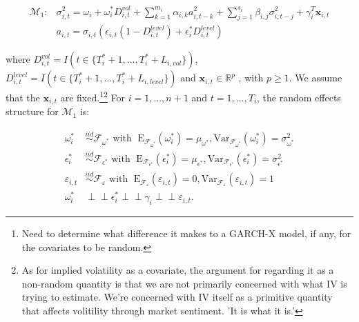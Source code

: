 \documentclass[11pt]{article}
\newcommand{\R}{\mathbb{R}}
\newcommand{\x}{\textbf{x}}
\def\mbf#1{\mathbf{#1}} %
\newcommand{\simiid}{\stackrel{iid}{\sim}} %
\newcommand{\indep}{\perp \!\!\! \perp } %
\def\mrm#1{\mathrm{#1}} %
\def\mc#1{\mathcal{#1}} %
\def\mc#1{\mathcal{#1}}
\theoremstyle{definition}
\begin{document}
\begin{align}
\mc{M}_1 \colon &\sigma^{2}_{i,t} = \omega_{i} + \omega^{*}_i D^{vol}_{i,t} + \sum^{m_{i}}_{k=1}\alpha_{i,k}a^{2}_{i,t-k} + \sum_{j=1}^{s_{i}}\beta_{i,j}\sigma_{i,t-j}^{2} + \gamma_{i}^{T} \x_{i,t}\\
&a_{i,t} = \sigma_{i,t}(\epsilon_{i,t}(1-D^{level}_{i,t}) + \epsilon^{*}_{i}D^{level}_{i,t}) \label{equation1}
\end{align}

 where $D^{vol}_{i,t} = I(t \in \{T_i^* + 1,...,T_i^* + L_{i, vol}\})$, $D^{level}_{i,t} = I(t \in \{T_i^* + 1,...,T_i^* + L_{i, level}\})$ 
and $\x_{i,t} \in \R^{p}$ , with $p \geq 1$.  We assume that the 
$\mbf{x}_{i,t}$ are fixed.\footnote{Need to determine what difference it makes to a GARCH-X model, if any, for the covariates to be random.}\footnote{As for implied volatility as a covariate, the argument for regarding it as a non-random quantity is that we are not primarily concerned with what IV is trying to estimate.  We're concerned with IV itself as a primitive quantity that affects volitility through market sentiment. 'It is what it is.'}  For $i = 1, \ldots, n+1$ and $t=1, \ldots, T_i$, the random effects structure for $\mc{M}_1$ is:

\begin{align*}
\omega^{*}_i &\simiid \mc{F}_{\omega^{*}} \text{ with }  \; \mrm{E}_{\mc{F}_{\omega^{*}}}(\omega^{*}_i) = \mu_{\omega^{*}}, \mrm{Var}_{\mc{F}_{\omega^{*}}}(\omega^{*}_i)  = \sigma^2_{\omega^{*}}  \\
\epsilon^{*}_i &\simiid \mc{F}_{\epsilon^{*}} \text{ with }  \; \mrm{E}_{\mc{F}_{\epsilon^{*}}}(\epsilon^{*}_i) = \mu_{\epsilon^{*}}, \mrm{Var}_{\mc{F}_{\epsilon^{*}}}(\epsilon^{*}_i)  = \sigma^2_{\epsilon^{*}}  \\
\varepsilon_{i,t} & \simiid  \mc{F}_{\varepsilon} \text{ with }  \; \mrm{E}_{\mc{F}_{\varepsilon}}(\varepsilon_{i,t}) = 0, \mrm{Var}_{\mc{F}_{\varepsilon}}(\varepsilon_{i,t})  = 1 \\
\omega^{*}_{i} &\indep  \epsilon^{*}_i \indep \gamma_i \indep \varepsilon_{i,t}.
\end{align*}
\end{document}
